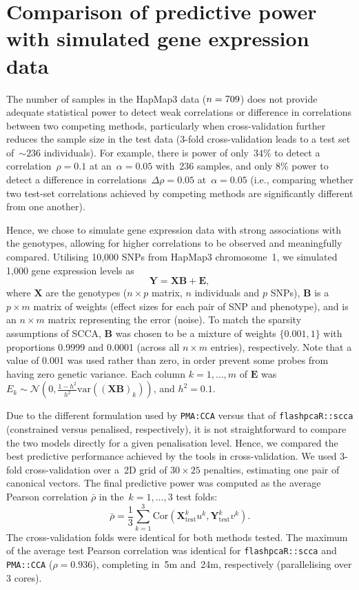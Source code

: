 \documentclass[a4paper,10pt]{article}
\begin{document}
\section{Comparison of predictive power with simulated gene expression data}
\label{section:sim}

The number of samples in the HapMap3 data ($n=709$) does not provide
adequate statistical power to detect weak correlations or difference in
correlations between two competing methods, particularly when cross-validation
further reduces the sample size in the test data (3-fold cross-validation
leads to a test set of~${\sim}236$ individuals). For example, there is power
of only~$34\%$ to detect a correlation~$\rho=0.1$ at an~$\alpha=0.05$
with~236 samples, and only $8\%$ power to detect a difference in
correlations~$\Delta\rho=0.05$ at~$\alpha=0.05$ (i.e., comparing whether
two test-set correlations achieved by competing methods are significantly
different from one another).


Hence, we chose to simulate gene expression data with strong associations
with the genotypes, allowing for higher correlations to be observed and
meaningfully compared.  Utilising 10,000 SNPs from HapMap3 chromosome~1,
we simulated 1,000 gene expression levels as
$$
\mathbf{Y} = \mathbf{X} \mathbf{B} + \mathbf{E},
$$
where $\mathbf{X}$ are the genotypes ($n \times p$ matrix, $n$ individuals and
$p$ SNPs), $\mathbf{B}$ is a $p \times m$ matrix of weights (effect sizes for
each pair of SNP and phenotype), and is an $n \times m$ matrix representing
the error (noise). To match the sparsity assumptions of SCCA, $\mathbf{B}$
was chosen to be a mixture of weights $\{0.001, 1\}$ with proportions 0.9999
and 0.0001 (across all $n \times m$ entries), respectively.  Note that a value
of 0.001 was used rather than zero, in order prevent some probes from having
zero genetic variance. Each column $k=1,\hdots,m$ of $\mathbf{E}$ was $E_k
\sim \mathcal{N}(0, \frac{1-h^2}{h^2} \mbox{var}((\mathbf{X}\mathbf{B})_k))$,
and $h^2=0.1$.

Due to the different formulation used by \texttt{PMA:CCA} versus that of
\texttt{flashpcaR::scca} (constrained versus penalised, respectively),
it is not straightforward to compare the two models directly for a given
penalisation level. Hence, we compared the best predictive performance
achieved by the tools in cross-validation.  We used 3-fold cross-validation
over a~2D grid of $30\times25$ penalties, estimating one pair of canonical
vectors. The final predictive power was computed as the average Pearson
correlation $\bar{\rho}$ in the~$k=1,\hdots,3$ test folds:
$$
\bar{\rho} = \frac{1}{3} \sum_{k=1}^3
   \mbox{Cor}(\mathbf{X}_{\mbox{test}}^k u^k, \mathbf{Y}_{\mbox{test}}^k v^k).
$$
The cross-validation folds were identical for both methods tested.
The maximum of the average test Pearson correlation was identical for
\texttt{flashpcaR::scca} and \texttt{PMA::CCA} ($\rho{=}0.936$), completing
in~5m and~24m, respectively (parallelising over 3 cores).
\end{document}
